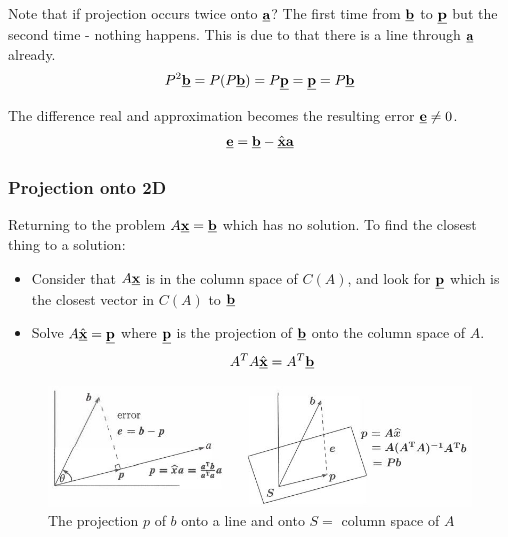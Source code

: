 \documentclass[10pt,a4paper]{article}
\begin{document}
\pagebreak

Note that if projection occurs twice onto $\textbf{\underline{a}}$? The ﬁrst time from
$\textbf{\underline{b}}$ to $\textbf{\underline{p}}$ but the second time - nothing happens. This is
due to that there is a line through $\textbf{\underline{a}}$ already.
\begin{align*}
    P^2 \textbf{\underline{b}} = P(P\textbf{\underline{b}}) = P\textbf{\underline{p}} = \textbf{\underline{p}} = P\textbf{\underline{b}}
\end{align*}

The difference real and approximation becomes the resulting error $\textbf{\underline{e}} \neq 0$.
\begin{align*}
    \textbf{\underline{e}} = \textbf{\underline{b}} - \hat{\textbf{\underline{x}}}\textbf{\underline{a}}
\end{align*}

\subsubsection{Projection onto 2D}

Returning to the problem $A\textbf{\underline{x}} = \textbf{\underline{b}}$ which has no solution.
To ﬁnd the closest thing to a solution:
\begin{itemize}
    \item Consider that $A\textbf{\underline{x}}$ is in the column
    space of $C(A)$, and look for $\textbf{\underline{p}}$ which is the closest vector in $C(A)$ to
    $\textbf{\underline{b}}$
    \item Solve $A\hat{\textbf{\underline{x}}} = \textbf{\underline{p}}$ where $\textbf{\underline{p}}$ is the projection of $\textbf{\underline{b}}$ onto the column
    space of $A$.
    \begin{align*}
        A^T A \hat{\textbf{\underline{x}}} = A^T \textbf{\underline{b}}
    \end{align*}
\end{itemize}
\begin{figure} [h!]
    \centering
    \includegraphics[scale=0.6]{proj.JPG}
    \caption{The projection $p$ of $b$ onto a line and onto $S =$ column space of $A$}
\end{figure}
\end{document}
